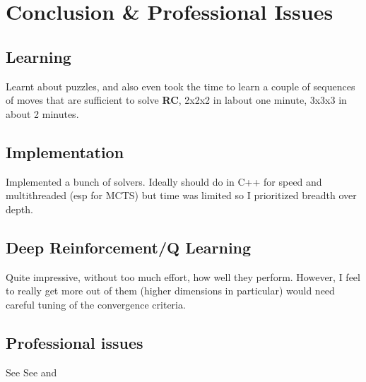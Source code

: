 
\chapter{Conclusion \& Professional Issues} %

\label{Conclusion} %



\section{Learning}
Learnt about puzzles, and also even took the time to learn a couple of sequences of moves that are sufficient to solve \textbf{RC}, 2x2x2 in labout one minute, 3x3x3 in about 2 minutes.

\section{Implementation}
Implemented a bunch of solvers. Ideally should do in C++ for speed and multithreaded (esp for MCTS) but time was limited so I prioritized breadth over depth.

\section{Deep Reinforcement/Q Learning}
Quite impressive, without too much effort, how well they perform. However, I feel to really get more out of them (higher dimensions in particular) would need careful tuning of the convergence criteria.

\section{Professional issues}
See \cite{ManyWorlds}
See \cite{https://doi.org/10.1111/1758-5899.12718} and \cite{Bostrom2014}
